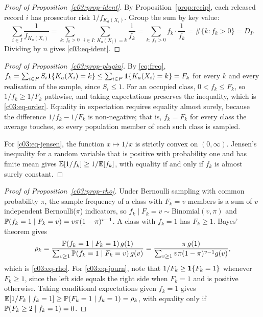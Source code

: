 \begin{proof}[Proof of Proposition~\ref{c03:prop-ident}]
By Proposition~\ref{prop:recip}, each released record $i$ has prosecutor risk
$1/f_{K_a(X_i)}$. Group the sum by key value:
\[
\sum_{i \in I}\frac{1}{f_{K_a(X_i)}}
= \sum_{k:\,f_k>0}\ \sum_{i \in I:\,K_a(X_i)=k}\frac{1}{f_k}
= \sum_{k:\,f_k>0} f_k\cdot\frac{1}{f_k}
= \#\{k : f_k > 0\} = D_I .
\]
Dividing by $n$ gives \eqref{c03:eq-ident}.
\end{proof}

\begin{proof}[Proof of Proposition~\ref{c03:prop-plugin}]
By \eqref{eq:freq}, $f_k = \sum_{i\in P} S_i\mathbf{1}\{K_a(X_i)=k\} \le
\sum_{i \in P}\mathbf{1}\{K_a(X_i)=k\} = F_k$ for every $k$ and every realisation of the
sample, since $S_i \le 1$. For an occupied class, $0 < f_k \le F_k$, so
$1/f_k \ge 1/F_k$ pathwise, and taking expectations preserves the inequality, which is
\eqref{c03:eq-order}. Equality in expectation requires equality almost surely, because
the difference $1/f_k - 1/F_k$ is non-negative; that is, $f_k = F_k$ for every class
the average touches, so every population member of each such class is sampled.

For \eqref{c03:eq-jensen}, the function $x \mapsto 1/x$ is strictly convex on
$(0,\infty)$. Jensen's inequality for a random variable that is positive with
probability one and has finite mean gives $\mathbb{E}[1/f_k] \ge 1/\mathbb{E}[f_k]$, with equality if
and only if $f_k$ is almost surely constant.
\end{proof}

\begin{proof}[Proof of Proposition~\ref{c03:prop-rho}]
Under Bernoulli sampling with common probability $\pi$, the sample frequency of a class
with $F_k = v$ members is a sum of $v$ independent Bernoulli($\pi$) indicators, so
$f_k \mid F_k = v \sim \mathrm{Binomial}(v,\pi)$ and
$\mathbb{P}(f_k = 1 \mid F_k = v) = v\pi(1-\pi)^{v-1}$. A class with $f_k = 1$ has
$F_k \ge 1$. Bayes' theorem gives
\[
\rho_k = \frac{\mathbb{P}(f_k = 1 \mid F_k = 1)\,g(1)}
{\sum_{v\ge1}\mathbb{P}(f_k=1\mid F_k=v)\,g(v)}
= \frac{\pi\,g(1)}{\sum_{v\ge1}v\pi(1-\pi)^{v-1}g(v)},
\]
which is \eqref{c03:eq-rho}. For \eqref{c03:eq-journ}, note that
$1/F_k \ge \mathbf{1}\{F_k = 1\}$ whenever $F_k \ge 1$, since the left side equals the right
side when $F_k = 1$ and is positive otherwise. Taking conditional expectations given
$f_k = 1$ gives $\mathbb{E}[1/F_k \mid f_k = 1] \ge \mathbb{P}(F_k = 1 \mid f_k = 1) = \rho_k$, with
equality only if $\mathbb{P}(F_k \ge 2 \mid f_k = 1) = 0$.
\end{proof}

